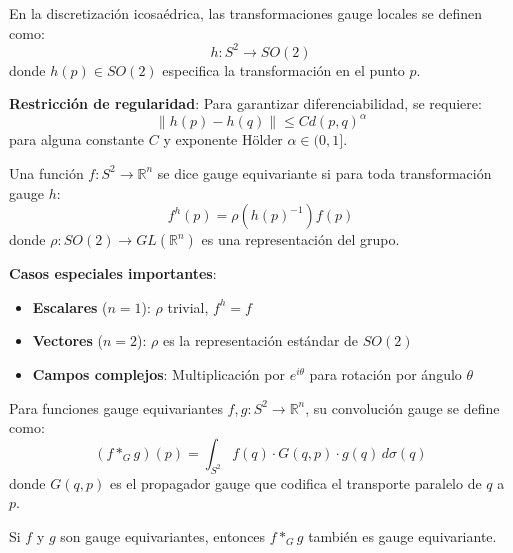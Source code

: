 \begin{definition}\label{def:transformacion_gauge_local}
En la discretización icosaédrica, las transformaciones gauge locales se definen como:
\begin{equation}
h: S^2 \to SO(2)
\end{equation}
donde $h(p) \in SO(2)$ especifica la transformación en el punto $p$.

\textbf{Restricción de regularidad}: Para garantizar diferenciabilidad, se requiere:
\begin{equation}
\|h(p) - h(q)\| \leq C d(p,q)^\alpha
\end{equation}
para alguna constante $C$ y exponente Hölder $\alpha \in (0,1]$.
\end{definition}

\begin{definition}\label{def:funcion_gauge_equivariante}
Una función $f: S^2 \to \mathbb{R}^n$ se dice gauge equivariante si para toda transformación gauge $h$:
\begin{equation}
f^h(p) = \rho(h(p)^{-1}) f(p)
\end{equation}
donde $\rho: SO(2) \to GL(\mathbb{R}^n)$ es una representación del grupo.

\textbf{Casos especiales importantes}:
\begin{itemize}
    \item \textbf{Escalares} ($n=1$): $\rho$ trivial, $f^h = f$
    \item \textbf{Vectores} ($n=2$): $\rho$ es la representación estándar de $SO(2)$
    \item \textbf{Campos complejos}: Multiplicación por $e^{i\theta}$ para rotación por ángulo $\theta$
\end{itemize}
\end{definition}

\begin{theorem}\label{thm:convolucion_gauge_equivariante}
Para funciones gauge equivariantes $f, g: S^2 \to \mathbb{R}^n$, su convolución gauge se define como:
\begin{equation}
(f *_G g)(p) = \int_{S^2} f(q) \cdot G(q, p) \cdot g(q) \, d\sigma(q)
\end{equation}
donde $G(q,p)$ es el propagador gauge que codifica el transporte paralelo de $q$ a $p$.

Si $f$ y $g$ son gauge equivariantes, entonces $f *_G g$ también es gauge equivariante.
\end{theorem}


